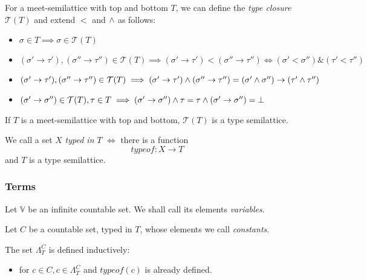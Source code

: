 \documentclass[main.tex]{subfiles}
\begin{document}
\begin{defn}
    For a meet-semilattice with top and bottom $T$, we can define the
    \emph{type closure} $\mathcal{T}(T)$ and extend $\less$ and $\wedge$ as follows:
    \begin{itemize}
        \item $\sigma \in T \implies \sigma \in \mathcal{T}(T)$
        \item $(\sigma' \rightarrow \tau'), (\sigma'' \rightarrow \tau'') \in
            \mathcal{T}(T) \implies
            (\sigma' \rightarrow \tau') \less (\sigma'' \rightarrow \tau'')
            \Leftrightarrow
            (\sigma' \less \sigma'') \& (\tau' \less \tau'')$
        \item $(\sigma' \rightarrow \tau'), (\sigma'' \rightarrow \tau'') \in
            \mathcal{T}(T) \implies
            (\sigma' \rightarrow \tau') \wedge (\sigma'' \rightarrow \tau'')
            =
            (\sigma' \wedge \sigma'') \rightarrow (\tau' \wedge \tau'')$
        \item $(\sigma' \rightarrow \sigma'') \in \mathcal{T}(T), \tau \in T
            \implies (\sigma' \rightarrow \sigma'') \wedge \tau
            = \tau \wedge (\sigma' \rightarrow \sigma'') = \bot$
    \end{itemize}
\end{defn}
\begin{prop}
    If $T$ is a meet-semilattice with top and bottom, $\mathcal{T}(T)$ is
    a type semilattice.
\end{prop}

\begin{defn}
    We call a set $X$ \emph{typed in} $T$ $\iff$ there is a function
    \[ typeof : X \rightarrow T \] and $T$ is a type semilattice.
\end{defn}

\subsubsection{Terms}
\begin{defn}
    Let $\mathbb{V}$ be an infinite countable set. We shall call its elements
    \emph{variables}.
\end{defn}

\begin{defn}
    Let $C$ be a countable set, typed in $T$,
    whose elements we call \emph{constants}.

    The set $\Lambda_T^C$ is defined inductively:
    \begin{itemize}
        \item for $c \in C, c \in \Lambda_T^C$
            and $typeof(c)$ is already defined.

    \end{itemize}
\end{defn}
\end{document}
